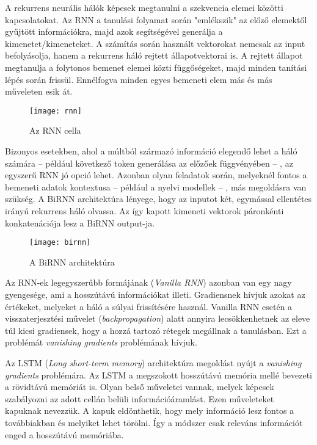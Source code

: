 A rekurrens neurális hálók képesek megtanulni a szekvencia elemei közötti kapcsolatokat. Az RNN a tanulási folyamat során "emlékszik" az előző elemektől gyűjtött információkra, majd azok segítségével generálja a kimenetet/kimeneteket. A számítás során használt vektorokat nemcsak az input befolyásolja, hanem a rekurrens háló rejtett állapotvektorai is. A rejtett állapot megtanulja a folytonos bemenet elemei közti függőségeket, majd minden tanítási lépés során frissül. Ennélfogva minden egyes bemeneti elem más és más műveleten esik át.

\begin{figure}[H]
	\centering
	\texttt{[image: rnn]}
	\caption{Az RNN cella \cite{rnn}}
\end{figure}

Bizonyos esetekben, ahol a múltból származó információ elegendő lehet a háló számára – például következő token generálása az előzőek függvényében – , az egyszerű RNN jó opció lehet. Azonban olyan feladatok során, melyeknél fontos a bemeneti adatok kontextusa – például a nyelvi modellek – , más megoldásra van szükség. A BiRNN architektúra lényege, hogy az inputot két, egymással ellentétes irányú rekurrens háló olvassa. Az így kapott kimeneti vektorok páronkénti konkatenációja lesz a BiRNN output-ja.

\begin{figure}[H]
	\centering
	\texttt{[image: birnn]}
	\caption{A BiRNN architektúra \cite{birnn}}
\end{figure}

Az RNN-ek legegyszerűbb formájának (\textit{Vanilla RNN}) azonban van egy nagy gyengesége, ami a hosszútávú információkat illeti. Gradiensnek hívjuk azokat az értékeket, melyeket a háló a súlyai frissítésére használ. Vanilla RNN esetén a visszaterjesztési művelet (\textit{backpropagation}) alatt annyira lecsökkenhetnek az eleve túl kicsi gradiensek, hogy a hozzá tartozó rétegek megállnak a tanulásban. Ezt a problémát \textit{vanishing gradients} problémának hívjuk.

Az LSTM (\textit{Long short-term memory}) architektúra megoldást nyújt a \textit{vanishing gradients} problémára. Az LSTM a megszokott hosszútávú memória mellé bevezeti a rövidtávú memóriát is. Olyan belső műveletei vannak, melyek képesek szabályozni az adott cellán belüli információáramlást. Ezen műveleteket kapuknak nevezzük. A kapuk eldönthetik, hogy mely információ lesz fontos a továbbiakban és melyiket lehet törölni. Így a módszer csak releváns információt enged a hosszútávú memóriába.


